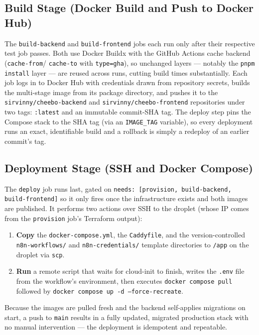 \documentclass[12pt, a4paper, oneside]{report}
\begin{document}
\subsection{Build Stage (Docker Build and Push to Docker Hub)}

The \texttt{build-backend} and \texttt{build-frontend} jobs each run
only after their respective test job passes. Both use Docker Buildx
with the GitHub Actions cache backend (\texttt{cache-from}/
\texttt{cache-to} with \texttt{type=gha}), so unchanged layers ---
notably the \texttt{pnpm install} layer --- are reused across runs,
cutting build times substantially. Each job logs in to Docker Hub
with credentials drawn from repository secrets, builds the
multi-stage image from its package directory, and pushes it to the
\texttt{sirvinny/cheebo-backend} and \texttt{sirvinny/cheebo-frontend}
repositories under two tags: \texttt{:latest} and an immutable
commit-SHA tag. The deploy step pins the Compose stack to the SHA tag
(via an \texttt{IMAGE\_TAG} variable), so every deployment runs an exact,
identifiable build and a rollback is simply a redeploy of an earlier
commit's tag.

\subsection{Deployment Stage (SSH and Docker Compose)}

The \texttt{deploy} job runs last, gated on \texttt{needs:
[provision, build-backend, build-frontend]} so it only fires once the
infrastructure exists and both images are published. It performs two
actions over SSH to the droplet (whose IP comes from the
\texttt{provision} job's Terraform output):

\begin{enumerate}[leftmargin=*,itemsep=2pt]
  \item \textbf{Copy} the \texttt{docker-compose.yml}, the
        \texttt{Caddyfile}, and the version-controlled
        \texttt{n8n-workflows/} and \texttt{n8n-credentials/}
        template directories to \texttt{/app} on the droplet via
        \texttt{scp}.
  \item \textbf{Run} a remote script that waits for cloud-init to
        finish, writes the \texttt{.env} file from the workflow's
        environment, then executes \texttt{docker compose pull}
        followed by \texttt{docker compose up -d
        --force-recreate}.
\end{enumerate}

Because the images are pulled fresh and the backend self-applies
migrations on start, a push to \texttt{main} results in a fully
updated, migrated production stack with no manual intervention ---
the deployment is idempotent and repeatable.
\end{document}
